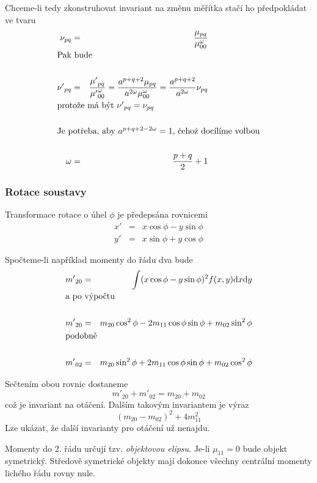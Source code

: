 Chceme-li tedy zkonstruhovat invariant na změnu měřítka stačí ho předpokládat ve tvaru
\begin{eqnarray}
\nu_{pq}&=&\frac{\mu_{pq}}{\mu^\omega_{00}}\\
\noalign{\hbox{Pak bude}\nonumber}\\
{\nu'}_{pq}&=&\frac{{\mu'}_{pq}} {{\mu'}^\omega_{00}}=\frac{a^{p+q+2}\mu_{pq}}{a^{2\omega}\mu^\omega_{00}}=
\frac{a^{p+q+2}}{a^{2\omega}}\nu_{pq}\nonumber\\
\noalign{\hbox{protože má být ${\nu'}_{pq}=\nu_{pq}$}\nonumber}\\
\noalign{\hbox{Je potřeba, aby $a^{p+q+2-2\omega}=1$, čehož docílíme volbou}\nonumber}\\
\omega&=&\frac{p+q}{2}+1
\end{eqnarray}


\subsubsection{Rotace soustavy}
Transformace rotace o úhel $\phi$ je předepsána rovnicemi
\begin{eqnarray}
x'&=&x\cos\phi-y\sin\phi\nonumber\\
y'&=&x\sin\phi+y\cos\phi
\end{eqnarray}

Spočteme-li například momenty do řádu dva bude
\begin{eqnarray}
{m'}_{20}&=&\int(x\cos\phi-y\sin\phi)^2f(x,y)\d x\d y\\
\noalign{\hbox{a po výpočtu}\nonumber}\\
{m'}_{20}&=& m_{20}\cos^2\phi-2m_{11}\cos\phi\sin\phi +m_{02}\sin^2\phi \\
\noalign{\hbox{podobně}\nonumber}\\
{m'}_{02}&=& m_{20}\sin^2\phi+2m_{11}\cos\phi\sin\phi +m_{02}\cos^2\phi 
\end{eqnarray}

\noindent Sečtením obou rovnic dostaneme
\begin{equation}
{m'}_{20}+{m'}_{02}=m_{20}+m_{02}
\end{equation}
\noindent což je invariant na otáčení. Dalším takovým invariantem je výraz
\begin{equation}
(m_{20}-m_{02})^2+4m^2_{11}
\end{equation}
Lze ukázat, že další invarianty pro otáčení už nenajdu.

Momenty do 2. řádu určují tzv. {\em objektovou elipsu}. Je-li $\mu_{11}=0$ bude objekt symetrický.
Středově symetrické objekty mají dokonce všechny centrální momenty lichého řádu rovny nule.

